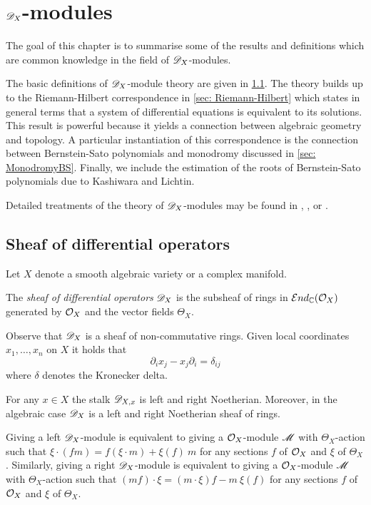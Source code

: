 \chapter{$\mathscr{D}_X$-modules}\label{Ch: ChapterDX}
The goal of this chapter is to summarise some of the results and definitions which are common knowledge in the field of $\mathscr{D}_X$-modules.

The basic definitions of $\mathscr{D}_X$-module theory are given in \cref{sec: SheafOfDiff}.
The theory builds up to the Riemann-Hilbert correspondence in \cref{sec: Riemann-Hilbert} which states in general terms that a system of differential equations is equivalent to its solutions.
This result is powerful because it yields a connection between algebraic geometry and topology.
A particular instantiation of this correspondence is the connection between Bernstein-Sato polynomials and monodromy discussed in \cref{sec: MonodromyBS}.
Finally, we include the estimation of the roots of Bernstein-Sato polynomials due to Kashiwara and Lichtin.

Detailed treatments of the theory of $\mathscr{D}_X$-modules may be found in  \cite{bjork1979rings}, \cite{kashiwara2003d}, \cite{hotta2007d} or \cite{borel1987algebraic}.
\section{Sheaf of differential operators}\label{sec: SheafOfDiff}
Let $X$ denote a smooth algebraic variety or a complex manifold.
\begin{definition}
  The {\it sheaf of differential operators} $\mathscr{D}_X$ is the subsheaf of rings in $\mathcal{E}nd_{\mathbb{C}}(\mathcal{O}_X)$ generated by $\mathcal{O}_X$ and the vector fields $\Theta_X$.
\end{definition}
Observe that $\mathscr{D}_X$ is a sheaf of non-commutative rings.
Given local coordinates $x_1,\ldots, x_n$ on $X$ it holds that
$$\partial_i x_j - x_j\partial_i = \delta_{ij} $$
where $\delta$ denotes the Kronecker delta.
\begin{lemma}{\cite[Proposition 1.4.6., Theorem 4.1.2]{hotta2007d}}
  For any $x\in X$ the stalk $\mathscr{D}_{X,x}$ is left and right Noetherian. Moreover, in the algebraic case $\mathscr{D}_X$ is a left and right Noetherian sheaf of rings.
\end{lemma}
Giving a left $\mathscr{D}_X$-module is equivalent to giving a $\mathcal{O}_X$-module $\mathscr{M}$ with $\Theta_X$-action such that
$\xi\cdot (fm) = f (\xi \cdot m)  + \xi(f)\ m  $
for any sections $f$ of $\mathcal{O}_X$ and $\xi$ of $\Theta_X$. Similarly, giving a right $\mathscr{D}_X$-module is equivalent to giving a $\mathcal{O}_X$-module $\mathscr{M}$ with $\Theta_X$-action such that
$(mf)\cdot\xi = (m\cdot\xi)f - m\ \xi(f) $ for any sections $f$ of $\mathcal{O}_X$ and $\xi$ of $\Theta_X$.

